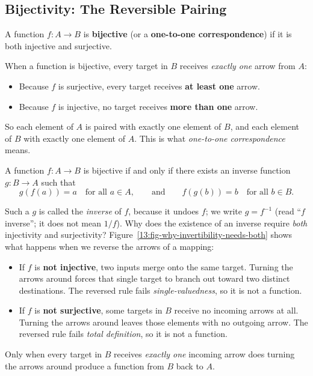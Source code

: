 \subsection{Bijectivity: The Reversible Pairing}

\begin{definition}[Bijective]
A function $f: A \to B$ is \textbf{bijective} (or a \textbf{one-to-one correspondence}) if it is both injective and surjective.
\end{definition}

When a function is bijective, every target in $B$ receives \emph{exactly one} arrow from $A$:
\begin{itemize}
\item Because $f$ is surjective, every target receives \textbf{at least one} arrow.
\item Because $f$ is injective, no target receives \textbf{more than one} arrow.
\end{itemize}
So each element of $A$ is paired with exactly one element of $B$, and each element of $B$ with exactly one element of $A$. This is what \emph{one-to-one correspondence} means.

\begin{theorem}
A function $f: A \to B$ is bijective if and only if there exists an inverse function $g: B \to A$ such that
\[
g(f(a)) = a \quad \text{for all } a \in A, \qquad \text{and} \qquad f(g(b)) = b \quad \text{for all } b \in B.
\]
\end{theorem}

Such a $g$ is called the \emph{inverse} of $f$, because it undoes $f$; we write $g = f^{-1}$ (read ``$f$ inverse''; it does not mean $1/f$). Why does the existence of an inverse require \emph{both} injectivity and surjectivity? Figure~\ref{13:fig-why-invertibility-needs-both} shows what happens when we reverse the arrows of a mapping:
\begin{itemize}
\item If $f$ is \textbf{not injective}, two inputs merge onto the same target. Turning the arrows around forces that single target to branch out toward two distinct destinations. The reversed rule fails \emph{single-valuedness}, so it is not a function.
\item If $f$ is \textbf{not surjective}, some targets in $B$ receive no incoming arrows at all. Turning the arrows around leaves those elements with no outgoing arrow. The reversed rule fails \emph{total definition}, so it is not a function.
\end{itemize}
Only when every target in $B$ receives \emph{exactly one} incoming arrow does turning the arrows around produce a function from $B$ back to $A$.

